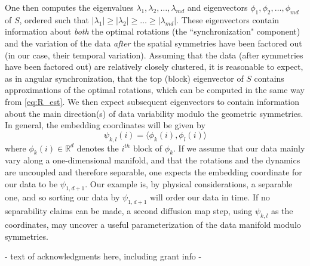 \documentclass{pnastwo}
\begin{document}
\begin{article}
\begin{materials}
One then computes the eigenvalues $\lambda_1, \lambda_2, \dots, \lambda_{md}$ and eigenvectors $\phi_1, \phi_2, \dots, \phi_{md}$ of $S$, ordered such that $|\lambda_1| \ge |\lambda_2| \ge \dots \ge |\lambda_{md}|$.
%
These eigenvectors contain information about {\it both} the optimal rotations (the ``synchronization" component) and the
variation of the data {\it after} the spatial symmetries have been factored out (in our case, their temporal variation).
%
Assuming that the data (after symmetries have been factored out) are relatively closely clustered, it is reasonable
to expect, as in angular synchronization, that the top (block) eigenvector of $S$ contains approximations of the optimal rotations,
which can be computed in the same way from \eqref{eq:R_est}.
%
We then expect subsequent eigenvectors to contain information about the main direction(s) of data variability modulo the geometric symmetries.
%
In general, the embedding coordinates will be given by
\begin{equation}
\psi_{k,l} (i) = \langle \phi_k(i), \phi_l(i) \rangle
\end{equation}
where $\phi_k(i) \in \mathbb{R}^d$ denotes the $i^{th}$ block of $\phi_k$.
%
If we assume that our data mainly vary along a one-dimensional manifold, and that the rotations and the dynamics are uncoupled and therefore separable, one expects the embedding coordinate for our data %
to be  $\psi_{1,d+1}$.
%
Our example is, by physical considerations, a separable one, and so sorting our data by $\psi_{1,d+1}$ will order our data in time.
%
If no separability claims can be made, a second diffusion map step, using $\psi_{k,l}$ as the coordinates, may uncover a
useful parameterization of the data manifold modulo symmetries.


\end{materials}




\begin{acknowledgments}
- text of acknowledgments here, including grant info -
\end{acknowledgments}


\end{article}
\end{document}
